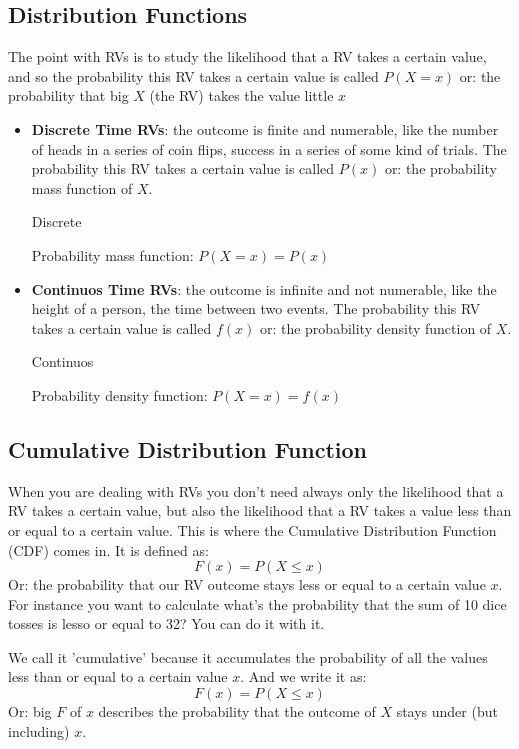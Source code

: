 \documentclass[a4paper]{article}
\newenvironment{focus}{\begin{focusbox}}{\end{focusbox}}
\begin{document}
\subsection{Distribution Functions}
The point with RVs is to study the likelihood that a RV takes a certain value, and so the probability this RV takes a certain value is called \(P(X = x)\) or: the probability that big $X$ (the RV) takes the value little $x$
\begin{itemize}
    \item \textbf{Discrete Time RVs}: the outcome is finite and numerable, like the number of heads in a series of coin flips, success in a series of some kind of trials. The probability this RV takes a certain value is called \(P(x)\) or: the probability mass function of $X$.\\

    \begin{focus}{Discrete}
        \centerline{Probability mass function: $P(X = x) = P(x)$ }
    \end{focus}
    \item \textbf{Continuos Time RVs}: the outcome is infinite and not numerable, like the height of a person, the time between two events. The probability this RV takes a certain value is called \(f(x)\) or: the probability density function of $X$.\\

    \begin{focus}{Continuos}
    \centerline{Probability density function: $ P(X = x) = f(x)$ }
    \end{focus}
\end{itemize}

\subsection{Cumulative Distribution Function}
When you are dealing with RVs you don't need always only the likelihood that a RV takes a certain value, but also the likelihood that a RV takes a value less than or equal to a certain value. This is where the Cumulative Distribution Function (CDF) comes in. It is defined as:
$$ F(x) = P(X \leq x) $$
Or: the probability that our RV outcome stays less or equal to a certain value $x$. 
For instance you want to calculate what's the probability that the sum of 10 dice tosses is lesso or equal to 32? You can do it with it.

We call it 'cumulative' because it accumulates the probability of all the values less than or equal to a certain value $x$. And we write it as:
$$ F(x) = P(X \leq x)$$ Or: big $F$ of $x$ describes the probability that the outcome of $X$ stays under (but including) $x$.
\end{document}
